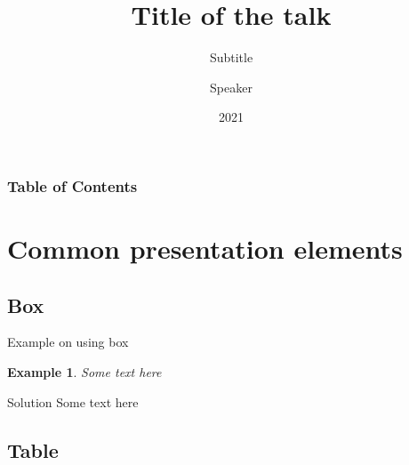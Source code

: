 \documentclass[aspectratio=169,t,xcolor=table]{beamer}
\newtheorem{ex}{Example}
\begin{document}
\title{Title of the talk}
\subtitle{Subtitle}

\author{Speaker}

\date{2021}

\frame[noframenumbering]{\titlepage}



\begin{frame}
    \frametitle{Table of Contents}
    \tableofcontents
\end{frame}



\section{Common presentation elements}

\subsection{Box}


\begin{frame}{Example on using box}

    \footnotesize
    
    \begin{ex}
        Some text here
    \end{ex}
    
    \begin{block}{Solution}
        Some text here
    \end{block}

\end{frame}

\subsection{Table}
\end{document}
